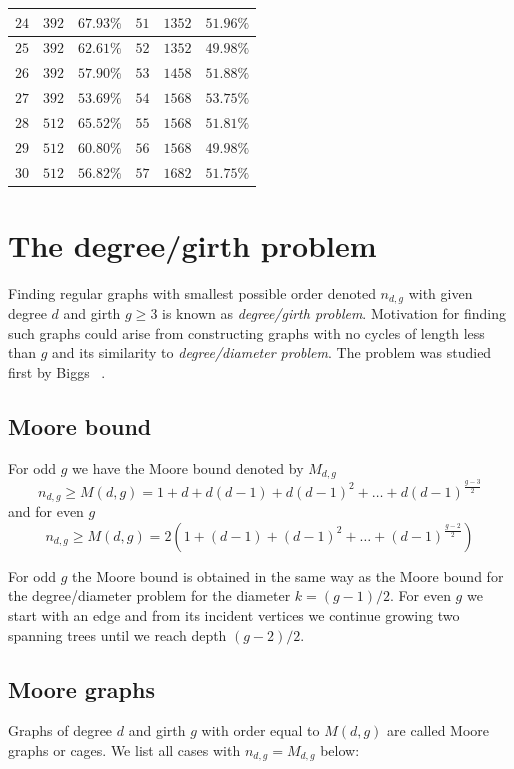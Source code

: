 \documentclass[a4paper,12pt,oneside]{report}%
\begin{document}
\begin{center}
{\begin{tabular}{| l | l | l | l | l | l |}
			$24$ & $392$ & $67.93\%$ &       			$51$ & $1352$ & $51.96\%$ \\ \hline
			$25$ & $392$ & $62.61\%$ &       			$52$ & $1352$ & $49.98\%$ \\ \hline
			$26$ & $392$ & $57.90\%$ &       			$53$ & $1458$ & $51.88\%$ \\ \hline
			$27$ & $392$ & $53.69\%$ &       			$54$ & $1568$ & $53.75\%$ \\ \hline
			$28$ & $512$ & $65.52\%$ &       			$55$ & $1568$ & $51.81\%$ \\ \hline
			$29$ & $512$ & $60.80\%$ &       			$56$ & $1568$ & $49.98\%$ \\ \hline
			$30$ & $512$ & $56.82\%$ &       			$57$ & $1682$ & $51.75\%$ \\ \hline
		\end{tabular}
	}
\end{center}

\section{The degree/girth problem}
Finding regular graphs with smallest possible order denoted $n_{d,g}$ with given degree $d$ and girth $g\geq3$ is known as {\em degree/girth problem}. Motivation for finding such graphs could arise from constructing graphs with no cycles of length less than $g$ and its similarity to {\em degree/diameter problem}. The problem was studied first by Biggs ~\cite{Biggs}.
\subsection{Moore bound}
For odd $g$ we have the Moore bound denoted by $M_{d,g}$
\begin{equation*}
	n_{d,g} \geq M(d,g) = 1 + d + d(d - 1) + d(d - 1)^{2} + \dots + d(d - 1)^{\frac{g-3}{2}}
\end{equation*}	
and for even $g$
\begin{equation*}
	n_{d,g} \geq M(d,g) = 2(1 + (d - 1) + (d - 1)^{2} + \dots + (d - 1)^{\frac{g-2}{2}})
\end{equation*}	

For odd $g$ the Moore bound is obtained in the same way as the Moore bound for the degree/diameter problem for the diameter $k=(g-1)/2$. For even $g$ we start with an edge and from its incident vertices we continue growing two spanning trees until we reach depth $(g-2)/2$.
\subsection{Moore graphs}
Graphs of degree $d$ and girth $g$ with order equal to $M(d,g)$ are called Moore graphs or cages. We list all cases with $n_{d,g} = M_{d,g}$ below:
\end{document}
